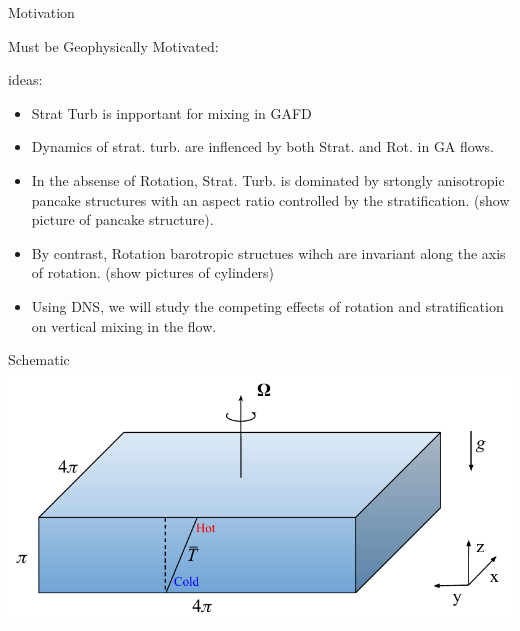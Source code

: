 \documentclass{beamer}
\begin{document}
\begin{frame}{Motivation}

Must be Geophysically Motivated:

ideas:
\begin{itemize}

\item Strat Turb is inpportant for mixing in GAFD

\item Dynamics of strat. turb. are inflenced by both Strat. and Rot. in GA
flows.

\item In the absense of Rotation, Strat. Turb. is dominated by srtongly
anisotropic pancake structures with an aspect ratio controlled by the
stratification. (show picture of pancake structure).

\item By contrast, Rotation barotropic structues wihch are invariant along the
axis of rotation. (show pictures of cylinders)


\item Using DNS, we will study the competing effects of rotation and
stratification on vertical mixing in the flow. 

\end{itemize}


\end{frame}

\begin{frame}{Schematic}
    \includegraphics[width = \textwidth]{images/schematic.pdf}

\end{frame}
\end{document}
